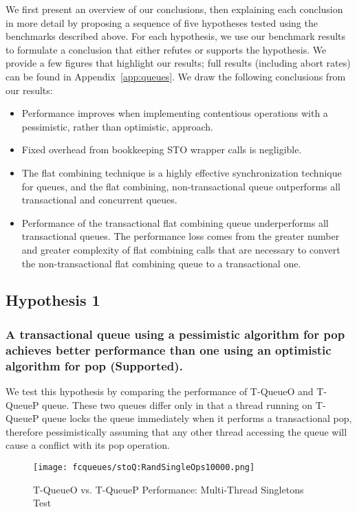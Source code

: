 We first present an overview of our conclusions, then explaining each conclusion in more detail by proposing a sequence of five hypotheses tested using the benchmarks described above. For each hypothesis, we use our benchmark results to formulate a conclusion that either refutes or supports the hypothesis.
We provide a few figures that highlight our results; full results (including abort rates) can be found in Appendix~\ref{app:queues}. We draw the following conclusions from our results:
\begin{itemize}
    \item Performance improves when implementing contentious operations with a pessimistic, rather than optimistic, approach.
    \item Fixed overhead from bookkeeping STO wrapper calls is negligible.
    \item The flat combining technique is a highly effective synchronization technique for queues, and the flat combining, non-transactional queue outperforms all transactional and concurrent queues.
    \item Performance of the transactional flat combining queue underperforms all transactional queues. The performance loss comes from the greater number and greater complexity of flat combining calls that are necessary to convert the non-transactional flat combining queue to a transactional one.
\end{itemize}

\subsection[Hypothesis 1]{Hypothesis 1}
\subsubsection{A transactional queue using a pessimistic algorithm for pop achieves better performance than one using an optimistic algorithm for pop (Supported).}

We test this hypothesis by comparing the performance of T-QueueO and T-QueueP queue. These two queues differ only in that a thread running on T-QueueP queue locks the queue immediately when it performs a transactional pop, therefore pessimistically assuming that any other thread accessing the queue will cause a conflict with its pop operation.

\begin{figure}[t!]
    \centering
	\begin{minipage}{\textwidth}
        {\texttt{[image: fcqueues/stoQ:RandSingleOps10000.png]}}
	\end{minipage}
    \caption{T-QueueO vs. T-QueueP Performance: Multi-Thread Singletons Test}
    \label{fig:stoqs}
\end{figure}

